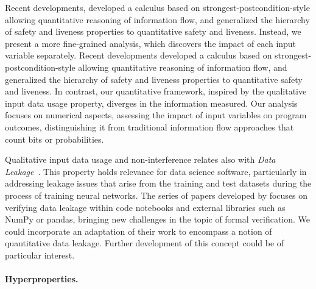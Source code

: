 Recent developments,  developed a calculus based on strongest-postcondition-style allowing quantitative reasoning of information flow, and  generalized the hierarchy of safety and liveness properties to quantitative safety and liveness.
Instead, we present a more fine-grained analysis, which discovers the impact of each input variable separately.
Recent developments  developed a calculus based on strongest-postcondition-style allowing quantitative reasoning of information flow, and  generalized the hierarchy of safety and liveness properties to quantitative safety and liveness. In contrast, our quantitative framework, inspired by the qualitative input data usage property, diverges in the information measured. Our analysis focuses on numerical aspects, assessing the impact of input variables on program outcomes, distinguishing it from traditional information flow approaches that count bits or probabilities.

Qualitative input data usage and non-interference relates also with \textit{Data Leakage}~.
This property holds relevance for data science software, particularly in addressing leakage issues that arise from the training and test datasets during the process of training neural networks.
The series of papers developed by  focuses on verifying data leakage within code notebooks and external libraries such as NumPy or pandas, bringing new challenges in the topic of formal verification.
We could incorporate an adaptation of their work to encompass a notion of quantitative data leakage.
Further development of this concept could be of particular interest.

\paragraph{Hyperproperties.}

